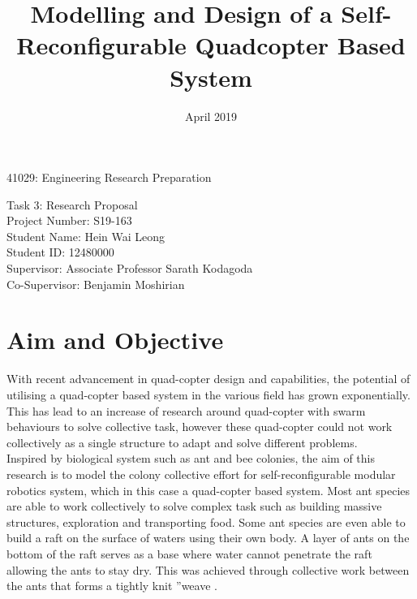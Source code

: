 \documentclass[12pt,A4]{article}
\title{Modelling and Design of a Self-Reconfigurable Quadcopter Based System}
\date{April 2019}
\begin{document}
	\maketitle
	\begin{center}
		41029: Engineering Research Preparation\\\centering
		
		Task 3: Research Proposal\\\centering
		\bigskip
		\bigskip
		\bigskip
		\bigskip
		\bigskip
		\bigskip
		\bigskip
		\bigskip
		\bigskip
		\bigskip
		\bigskip
		\bigskip
		\bigskip
		\bigskip
		\bigskip
		Project Number: S19-163\\\centering
		Student Name: Hein Wai Leong\\\centering
		Student ID: 12480000\\\centering
		Supervisor: Associate Professor Sarath Kodagoda\\\centering
		Co-Supervisor: Benjamin Moshirian\\\centering
	\end{center}
	\pagebreak
	
	\section{Aim and Objective}
	
	With recent advancement in quad-copter design and capabilities, the potential of utilising a quad-copter based system in the various field has grown exponentially. This has lead to an increase of research around quad-copter with swarm behaviours to solve collective task, however these quad-copter could not work collectively as a single structure to adapt and solve different problems.\\
	
	Inspired by biological system such as ant and bee colonies, the aim of this research is to model the colony collective effort for self-reconfigurable modular robotics system, which in this case a quad-copter based system. Most ant species are able to work collectively to solve complex task such as building massive structures, exploration and transporting food. Some ant species are even able to build a raft on the surface of waters using their own body. A layer of ants on the bottom of the raft serves as a base where water cannot penetrate the
	raft allowing the ants to stay dry. This was achieved through collective work
	between the ants that forms a tightly knit ”weave \citep{mlot2011fire}.\\
	
\end{document}

